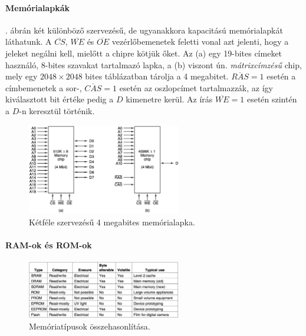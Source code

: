 \documentclass[10pt]{article}
\begin{document}
\paragraph{Memórialapkák}

. ábrán két különböző szervezésű, de ugyanakkora kapacitású memórialapkát láthatunk. A $\overline{CS}$, $\overline{WE}$ és $\overline{OE}$ vezérlőbemenetek feletti vonal azt jelenti, hogy a jeleket negálni kell, mielőtt a chipre kötjük őket. Az (a) egy 19-bites címeket használó, 8-bites szavakat tartalmazó lapka, a (b) viszont ún. \emph{mátrixcímzésű} chip, mely egy $2048\times2048$ bites táblázatban tárolja a 4 megabitet. $\overline{RAS}=1$ esetén a címbemenetek a sor-, $\overline{CAS}=1$ esetén az oszlopcímet tartalmazzák, az így kiválasztott bit értéke pedig a $D$ kimenetre kerül. Az írás $\overline{WE}=1$ esetén szintén a $D$-n keresztül történik.

\begin{figure}[htbp]
	\centering
		\includegraphics[width=0.6\textwidth]{img/memorialapkak}
	\caption{Kétféle szervezésű 4 megabites memórialapka.\label{fig:memorialapkak}}
\end{figure}

\paragraph{RAM-ok és ROM-ok}

\begin{figure}[h]
	\centering
		\includegraphics[width=0.6\textwidth]{img/memoriatipusok}
	\caption{Memóriatípusok összehasonlítása.\label{fig:memoriatipusok}}
\end{figure}
\end{document}
